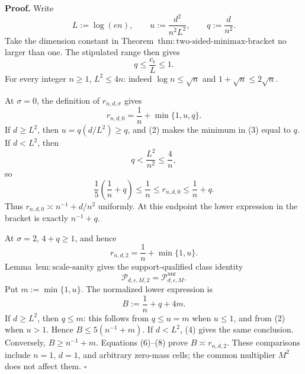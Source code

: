 \textbf{Proof.}
Write
\[
 L:=\log(en),\qquad u:=\frac{d^2}{n^2L^2},\qquad q:=\frac d{n^2}.
\tag{1}
\]
Take the dimension constant in Theorem~\(\mathrm{thm:two\text{-}sided\text{-}minimax\text{-}bracket}\) no larger than one.  The stipulated range then gives
\[
 q\le\frac{c_{\epsilon}}L\le1.
\tag{2}
\]
For every integer \(n\ge1\), \(L^2\le4n\): indeed \(\log n\le\sqrt n\) and \(1+\sqrt n\le2\sqrt n\).

At \(\sigma=0\), the definition of \(r_{n,d,\sigma}\) gives
\[
 r_{n,d,0}=\frac1n+\min\{1,u,q\}.
\tag{3}
\]
If \(d\ge L^2\), then \(u=q(d/L^2)\ge q\), and (2) makes the minimum in (3) equal to \(q\).  If \(d<L^2\), then
\[
 q<\frac{L^2}{n^2}\le\frac4n,
\tag{4}
\]
so
\[
 \frac15\left(\frac1n+q\right)\le\frac1n\le r_{n,d,0}\le\frac1n+q.
\tag{5}
\]
Thus \(r_{n,d,0}\asymp n^{-1}+d/n^2\) uniformly.  At this endpoint the lower expression in the bracket is exactly \(n^{-1}+q\).

At \(\sigma=2\), \(4+q\ge1\), and hence
\[
 r_{n,d,2}=\frac1n+\min\{1,u\}.
\tag{6}
\]
Lemma~\(\mathrm{lem:scale\text{-}sanity}\) gives the support-qualified class identity
\[
 \mathcal P_{d,\epsilon,M,2}=\mathcal P_{d,\epsilon,M}^{\mathrm{unr}}.
\tag{7}
\]
Put \(m:=\min\{1,u\}\).  The normalized lower expression is
\[
 B:=\frac1n+q+4m.
\tag{8}
\]
If \(d\ge L^2\), then \(q\le m\): this follows from \(q\le u=m\) when \(u\le1\), and from (2) when \(u>1\).  Hence \(B\le5(n^{-1}+m)\).  If \(d<L^2\), (4) gives the same conclusion.  Conversely, \(B\ge n^{-1}+m\).  Equations (6)--(8) prove \(B\asymp r_{n,d,2}\).  These comparisons include \(n=1\), \(d=1\), and arbitrary zero-mass cells; the common multiplier \(M^2\) does not affect them. \(\square\)